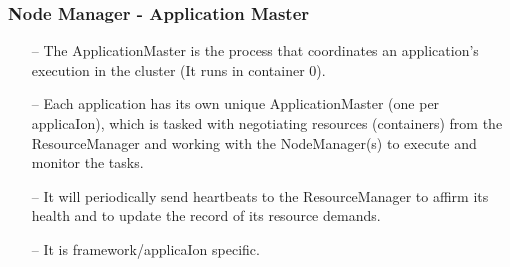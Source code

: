 \begin{frame}[c]{ }
	\frametitle{Node Manager - Application Master }
	
	{\footnotesize
		\begin{itemize}  [<+->]
			\item [--] The ApplicationMaster is the process that coordinates an application’s execution in the cluster (It runs in container 0).

			\item [--] Each application has its own unique ApplicationMaster (one per applicaIon), which is tasked with negotiating resources (containers) from the ResourceManager and working with the NodeManager(s) to execute and monitor the tasks.

			\item [--] It will periodically send heartbeats to the ResourceManager to affirm its health and to update the record of its resource demands.

			\item [--] It is framework/applicaIon specific.			

		\end{itemize}
	}
\end{frame}

